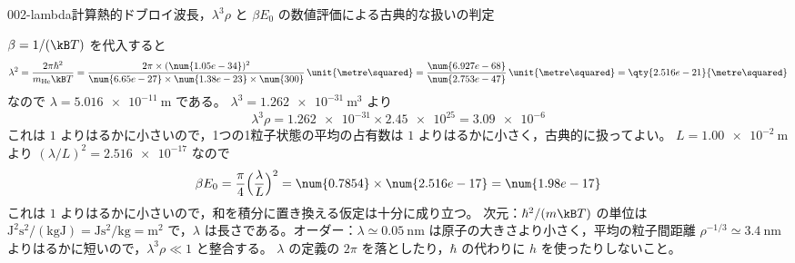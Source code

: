 \documentclass[uplatex,dvipdfmx,a4paper,11pt]{jsarticle}
\begin{document}
\begin{mondai}{002-lambda}{計算}{熱的ドブロイ波長，$\lambda^{3}\rho$ と $\beta E_0$ の数値評価による古典的な扱いの判定}
\begin{tadashii}
\keisan {} $\beta=1/(\kB T)$ を代入すると
\[ \lambda^{2}=\frac{2\pi\hbar^{2}}{m_{\mathrm{He}}\kB T}=\frac{2\pi\times(\num{1.05e-34})^{2}}{\num{6.65e-27}\times\num{1.38e-23}\times\num{300}}\,\unit{\metre\squared}=\frac{\num{6.927e-68}}{\num{2.753e-47}}\,\unit{\metre\squared}=\qty{2.516e-21}{\metre\squared} \]
なので $\lambda=\qty{5.016e-11}{\metre}$ である。
 $\lambda^{3}=\qty{1.262e-31}{\metre\cubed}$ より
\[ \lambda^{3}\rho=\num{1.262e-31}\times\num{2.45e25}=\num{3.09e-6} \]
これは $1$ よりはるかに小さいので，1つの1粒子状態の平均の占有数は $1$ よりはるかに小さく，古典的に扱ってよい。
 $L=\qty{1.00e-2}{\metre}$ より $(\lambda/L)^{2}=\num{2.516e-17}$ なので
\[ \beta E_0=\frac{\pi}{4}\Bigl(\frac{\lambda}{L}\Bigr)^{2}=\num{0.7854}\times\num{2.516e-17}=\num{1.98e-17} \]
これは $1$ よりはるかに小さいので，和を積分に置き換える仮定は十分に成り立つ。
\kenzan 次元：$\hbar^{2}/(m\kB T)$ の単位は $\unit{\joule\squared\second\squared}/(\unit{\kilogram\joule})=\unit{\joule\second\squared\per\kilogram}=\unit{\metre\squared}$ で，$\lambda$ は長さである。オーダー：$\lambda\simeq\qty{0.05}{\nano\metre}$ は原子の大きさより小さく，平均の粒子間距離 $\rho^{-1/3}\simeq\qty{3.4}{\nano\metre}$ よりはるかに短いので，$\lambda^{3}\rho\ll1$ と整合する。
\tsumazuki $\lambda$ の定義の $2\pi$ を落としたり，$\hbar$ の代わりに $h$ を使ったりしないこと。
\end{tadashii}
\end{mondai}
\end{document}
